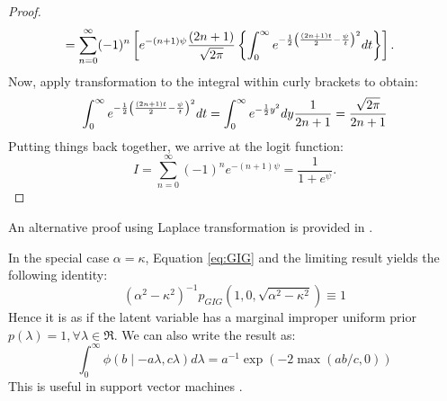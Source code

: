 \documentclass[letterpaper,11pt]{article}
\begin{document}
\begin{proof}
\begin{align*}
& = \sum_{n=0}^{\infty} (-1)^n \left[  e^{-(n+1)\psi} \frac{(2n+1)}{\sqrt{2\pi}} \left\{ \int_{0}^{\infty}e^{-\frac{1}{2} \left( \frac{(2n+1)t}{2} - \frac{\psi}{t}\right)^2 } dt \right\} \right].
\end{align*}
Now, apply \CS transformation to the integral within curly brackets to obtain: 
$$ 
\int_{0}^{\infty}e^{-\frac{1}{2} \left( \frac{(2n+1)t}{2} - \frac{\psi}{t}\right)^2 } dt = \int_0^{\infty} e^{-\frac{1}{2} y^2} dy \frac{1}{2n+1} = \frac{\sqrt{2\pi}}{2n+1}
$$
Putting things back together, we arrive at the logit function: 
$$
I = \sum_{n=0}^{\infty} (-1)^n e^{-(n+1)\psi} = \frac{1}{1+e^{\psi}}.
$$
\end{proof}

An alternative proof using Laplace transformation is provided in \cite{polson2013bayesian}. 
\begin{remark}
In the special case $\alpha = \kappa$, Equation \eqref{eq:GIG} and the limiting result yields the following identity: 
$$
(\alpha^2-\kappa^2)^{-1}p_{GIG}(1,0,\sqrt{\alpha^2-\kappa^2}) \equiv 1
$$
Hence it is as if the latent variable has a marginal improper uniform prior $p(\lambda) = 1, \forall \lambda \in \Re$. We can also write the result as: 
\begin{equation}
  \int_{0}^{\infty} \phi(b \mid -a\lambda, c\lambda) d\lambda = a^{-1} \exp(-2 \max(ab/c,0)) \label{eq:svm}
\end{equation}
This is useful in support vector machines \cite{polson2011data}.
\end{remark}
\end{document}
